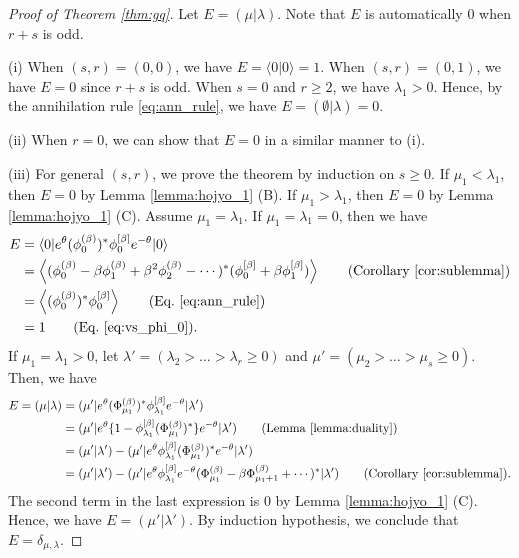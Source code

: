 \documentclass{amsart}
\def\ket#1{\vert #1 \rangle}
\def\bra#1{\langle #1 \vert}
\def\mket#1{\vert #1 )}
\def\mbra#1{( #1 \vert}
\begin{document}
\begin{proof}[Proof of Theorem \ref{thm:gq}]
Let $E=( \mu|\lambda)$.
Note that $E$ is automatically $0$ when $r+s$ is odd.

(i) 
When $(s,r)=(0,0)$, we have $E=\langle 0|0\rangle=1$.
When $(s,r)=(0,1)$, we have $E=0$ since $r+s$ is odd.
When $s=0$ and $r\geq 2$, we have $\lambda_1>0$.
Hence, by the annihilation rule \eqref{eq:ann_rule}, we have $E=(\emptyset|\lambda)=0$.

(ii) 
When $r=0$, we can show that $E=0$ in a similar manner to (i).

(iii)
For general $(s,r)$, we prove the theorem by induction on $s\geq 0$.
If $\mu_1<\lambda_1$, then $E=0$ by Lemma \ref{lemma:hojyo_1} (B). 
If $\mu_1>\lambda_1$, then $E=0$ by Lemma \ref{lemma:hojyo_1} (C).
Assume $\mu_1=\lambda_1$.
If $\mu_1=\lambda_1=0$, then we have
\[
\begin{aligned}
E
&=
\bra{0}e^{\theta}(\phi^{(\beta)}_0)^\ast \phi_0^{[\beta]}e^{-\theta}\ket{0}\\
&
=
\left\langle(\phi^{(\beta)}_0-\beta \phi^{(\beta)}_1+\beta^2\phi^{(\beta)}_2-\cdots )^\ast (\phi_0^{[\beta]}+\beta \phi_1^{[\beta]})
\right\rangle
\qquad (\text{Corollary~\ref{cor:sublemma}})
\\
&
=\left\langle
(\phi^{(\beta)}_0)^\ast \phi_0^{[\beta]}
\right\rangle\qquad (\text{Eq.~\eqref{eq:ann_rule}})\\
&=1\qquad (\text{Eq.~\eqref{eq:vs_phi_0}}).
\end{aligned}
\]
If $\mu_1=\lambda_1>0$, let 
$\lambda'=(\lambda_2>\dots>\lambda_r\geq 0)$ and
$\mu'=(\mu_2>\dots>\mu_s\geq 0)$.
Then, we have
\[
\begin{aligned}
E
=
(\mu|\lambda)
&=
\mbra{\mu'}
e^\theta (\Phi^{(\beta)}_{\mu_1})^\ast
\phi^{[\beta]}_{\lambda_1} e^{-\theta}
\mket{\lambda'}\\
&
=
\mbra{\mu'}
e^\theta 
\{
1-\phi^{[\beta]}_{\lambda_1} (\Phi^{(\beta)}_{\mu_1})^\ast
\}
e^{-\theta}
\mket{\lambda'}\qquad
(\mathrm{Lemma\ \ref{lemma:duality}})
\\
&=
(\mu'|\lambda')
-
\mbra{\mu'}
e^\theta 
\phi^{[\beta]}_{\lambda_1} (\Phi^{(\beta)}_{\mu_1})^\ast
e^{-\theta}
\mket{\lambda'}\\
&=
( \mu'|\lambda')
-
\mbra{\mu'}
e^\theta 
\phi^{[\beta]}_{\lambda_1} 
e^{-\theta}
(\Phi^{(\beta)}_{\mu_1}-\beta \Phi^{(\beta)}_{\mu_1+1}+\cdots)^\ast
\mket{\lambda'}\qquad (\mathrm{Corollary~\ref{cor:sublemma}}).
\end{aligned}
\]
The second term in the last expression is $0$ by Lemma \ref{lemma:hojyo_1} (C).
Hence, we have $E=(\mu'|\lambda').$
By induction hypothesis, we conclude that $E=\delta_{\mu,\lambda}$.
\end{proof}
\end{document}
